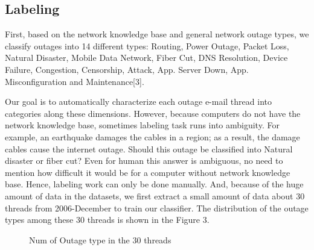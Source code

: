 \documentclass{sig-alternate}
\begin{document}
\subsection{Labeling}
First, based on the network knowledge base and general network outage types, we classify outages into 14 different types: Routing, Power Outage, Packet Loss, Natural Disaster, Mobile Data Network, Fiber Cut, DNS Resolution, Device Failure, Congestion, Censorship, Attack, App. Server Down, App. Misconfiguration and Maintenance[3]. 
\par Our goal is to automatically characterize each outage e-mail thread into categories along these dimensions. However, because computers do not have the network knowledge base, sometimes labeling task runs into ambiguity. For example, an earthquake damages the cables in a region; as a result, the damage cables cause the internet outage. Should this outage be classified into Natural disaster or fiber cut? Even for human this answer is ambiguous, no need to mention how difficult it would be for a computer without network knowledge base. Hence, labeling work can only be done manually. And, because of the huge amount of data in the datasets, we first extract a small amount of data about 30 threads from 2006-December to train our classifier. The distribution of the outage types among these 30 threads is shown in the Figure 3.

\begin{figure}[h]
\centering
{}
\caption{Num of Outage type in the 30 threads}
\end{figure}
\end{document}
